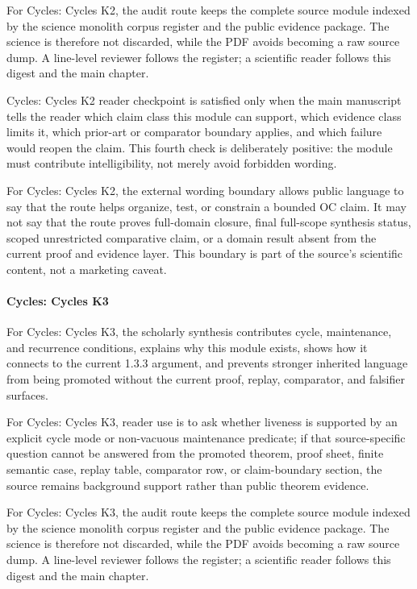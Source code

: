 For Cycles: Cycles K2, the audit route keeps the complete source module indexed by the science monolith corpus register and the public evidence package. The science is therefore not discarded, while the PDF avoids becoming a raw source dump. A line-level reviewer follows the register; a scientific reader follows this digest and the main chapter.


Cycles: Cycles K2 reader checkpoint is satisfied only when the main manuscript tells the reader which claim class this module can support, which evidence class limits it, which prior-art or comparator boundary applies, and which failure would reopen the claim. This fourth check is deliberately positive: the module must contribute intelligibility, not merely avoid forbidden wording.


For Cycles: Cycles K2, the external wording boundary allows public language to say that the route helps organize, test, or constrain a bounded OC claim. It may not say that the route proves full-domain closure, final full-scope synthesis status, scoped unrestricted comparative claim, or a domain result absent from the current proof and evidence layer. This boundary is part of the source's scientific content, not a marketing caveat.


\paragraph{Cycles: Cycles K3}

For Cycles: Cycles K3, the scholarly synthesis contributes cycle, maintenance, and recurrence conditions, explains why this module exists, shows how it connects to the current 1.3.3 argument, and prevents stronger inherited language from being promoted without the current proof, replay, comparator, and falsifier surfaces.


For Cycles: Cycles K3, reader use is to ask whether liveness is supported by an explicit cycle mode or non-vacuous maintenance predicate; if that source-specific question cannot be answered from the promoted theorem, proof sheet, finite semantic case, replay table, comparator row, or claim-boundary section, the source remains background support rather than public theorem evidence.


For Cycles: Cycles K3, the audit route keeps the complete source module indexed by the science monolith corpus register and the public evidence package. The science is therefore not discarded, while the PDF avoids becoming a raw source dump. A line-level reviewer follows the register; a scientific reader follows this digest and the main chapter.


